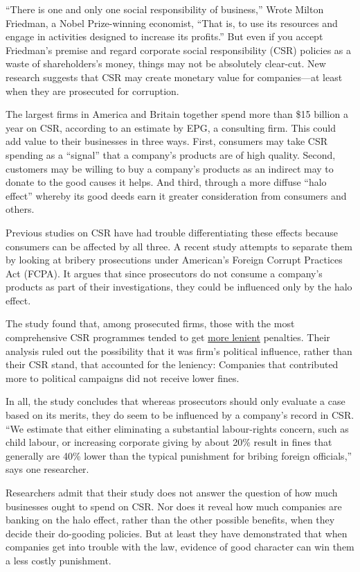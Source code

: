 ``There is one and only one social responsibility of business,''
Wrote Milton Friedman, a Nobel Prize-winning economist, ``That is, to
use its resources and engage in activities designed to increase its
profits.'' But even if you accept Friedman's premise and regard
corporate social responsibility (CSR) policies as a waste of
shareholders's money, things may not be absolutely clear-cut. New
research suggests that CSR may create monetary value for companies---at least when they are prosecuted for corruption.

The largest firms in America and Britain together spend more than
\$15 billion a year on CSR, according to an estimate by EPG, a
consulting firm. This could add value to their businesses in three
ways. First, consumers may take CSR spending as a ``signal'' that a
company's products are of high quality. Second, customers may be
willing to buy a company's products as an indirect may to donate to the
good causes it helps. And third, through a more diffuse ``halo
effect'' whereby its good deeds earn it greater consideration from
consumers and others.

Previous studies on CSR have had trouble differentiating these effects
because consumers can be affected by all three. A recent study attempts
to separate them by looking at bribery prosecutions under American's
Foreign Corrupt Practices Act (FCPA). It argues that since prosecutors
do not consume a company's products as part of their
investigations, they could be influenced only by the halo effect.

The study found that, among prosecuted firms, those with the most
comprehensive CSR programmes tended to get \uline{more lenient} penalties.
Their analysis ruled out the possibility that it was firm's political
influence, rather than their CSR stand, that accounted for the
leniency: Companies that contributed more to political campaigns did not
receive lower fines.

In all, the study concludes that whereas prosecutors should only
evaluate a case based on its merits, they do seem to be influenced by a
company's record in CSR. ``We estimate that either eliminating a
substantial labour-rights concern, such as child labour, or increasing
corporate giving by about 20\% result in fines that generally are 40\%
lower than the typical punishment for bribing foreign officials,'' says
one researcher.

Researchers admit that their study does not answer the question of
how much businesses ought to spend on CSR. Nor does it reveal how much
companies are banking on the halo effect, rather than the other
possible benefits, when they decide their do-gooding policies. But at
least they have demonstrated that when companies get into trouble with
the law, evidence of good character can win them a less costly
punishment.


